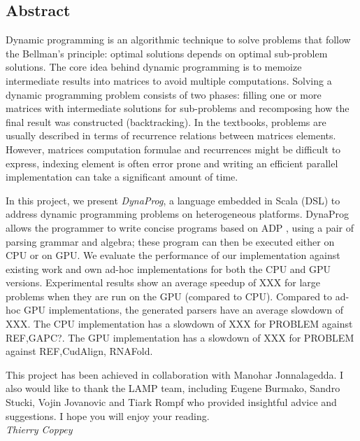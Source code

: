 \subsection*{Abstract}
Dynamic programming is an algorithmic technique to solve problems that follow the Bellman's principle\cite{bellman_principle}: optimal solutions depends on optimal sub-problem solutions. The core idea behind dynamic programming is to memoize intermediate results into matrices to avoid multiple computations. Solving a dynamic programming problem consists of two phases: filling one or more matrices with intermediate solutions for sub-problems and recomposing how the final result was constructed (backtracking). In the textbooks, problems are usually described in terms of recurrence relations between matrices elements. However, matrices computation formulae and recurrences might be difficult to express, indexing element is often error prone and writing an efficient parallel implementation can take a significant amount of time.

In this project, we present \textit{DynaProg}, a language embedded in Scala (DSL) to address dynamic programming problems on heterogeneous platforms. DynaProg allows the programmer to write concise programs based on ADP \cite{adp}, using a pair of parsing grammar and algebra; these program can then be executed either on CPU or on GPU. We evaluate the performance of our implementation against existing work and own ad-hoc implementations for both the CPU and GPU versions. Experimental results show an average speedup of {\color{red} XXX} for large problems when they are run on the GPU (compared to CPU). Compared to ad-hoc GPU implementations, the generated parsers have an average slowdown of {\color{red} XXX}.
The CPU implementation has a slowdown of {\color{red} XXX} for {\color{red} PROBLEM} against {\color{red} REF,GAPC?}.
The GPU implementation has a slowdown of {\color{red} XXX} for {\color{red} PROBLEM} against {\color{red} REF,CudAlign, RNAFold}.


\vfill
This project has been achieved in collaboration with Manohar Jonnalagedda. I also would like to thank the LAMP team, including Eugene Burmako, Sandro Stucki, Vojin Jovanovic and Tiark Rompf who provided insightful advice and suggestions. I hope you will enjoy your reading. \vspace{.3cm}\\
\textit{Thierry Coppey}

